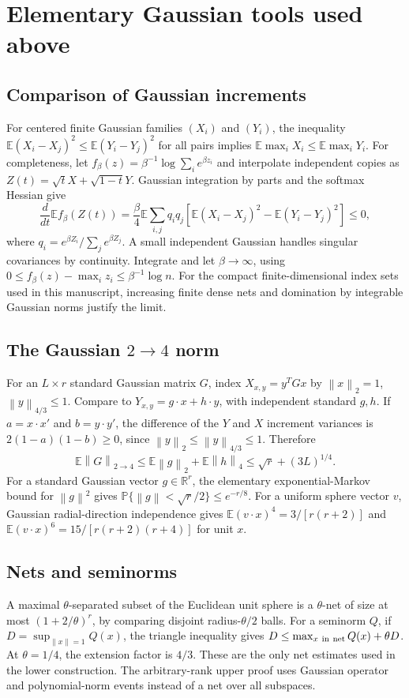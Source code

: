 \documentclass[11pt]{article}
\theoremstyle{remark}\newtheorem{remark}[theorem]{Remark}
\newcommand{\R}{\mathbb R}\newcommand{\E}{\mathbb E}\newcommand{\Prob}{\mathbb P}
\newcommand{\norm}[1]{\left\lVert#1\right\rVert}\newcommand{\abs}[1]{\left|#1\right|}
\numberwithin{equation}{section}
\begin{document}
\appendix
\section{Elementary Gaussian tools used above}\label{app:gaussian}
\subsection{Comparison of Gaussian increments}
For centered finite Gaussian families $(X_i)$ and $(Y_i)$, the inequality
$\E(X_i-X_j)^2\le\E(Y_i-Y_j)^2$ for all pairs implies
$\E\max_i X_i\le\E\max_i Y_i$.
For completeness, let $f_\beta(z)=\beta^{-1}\log\sum_i e^{\beta z_i}$ and interpolate independent copies as $Z(t)=\sqrt t X+\sqrt{1-t}Y$. Gaussian integration by parts and the softmax Hessian give
\[
 \frac d{dt}\E f_\beta(Z(t))
 =\frac\beta4\E\sum_{i,j}q_iq_j
 \left[\E(X_i-X_j)^2-\E(Y_i-Y_j)^2\right]\le0,
\]
where $q_i=e^{\beta Z_i}/\sum_j e^{\beta Z_j}$. A small independent Gaussian handles singular covariances by continuity. Integrate and let $\beta\to\infty$, using
$0\le f_\beta(z)-\max_i z_i\le\beta^{-1}\log n$.
For the compact finite-dimensional index sets used in this manuscript, increasing finite dense nets and domination by integrable Gaussian norms justify the limit.

\subsection{\texorpdfstring{The Gaussian $2\to4$ norm}{The Gaussian 2-to-4 norm}}
For an $L\times r$ standard Gaussian matrix $G$, index $X_{x,y}=y^TGx$ by $\norm x_2=1$, $\norm y_{4/3}\le1$. Compare to $Y_{x,y}=g\cdot x+h\cdot y$, with independent standard $g,h$. If $a=x\cdot x'$ and $b=y\cdot y'$, the difference of the $Y$ and $X$ increment variances is $2(1-a)(1-b)\ge0$, since $\norm y_2\le\norm y_{4/3}\le1$. Therefore
\[
 \E\norm G_{2\to4}\le\E\norm g_2+\E\norm h_4
 \le\sqrt r+(3L)^{1/4}.
\]
For a standard Gaussian vector $g\in\R^r$, the elementary exponential-Markov bound for $\norm g^2$ gives
$\Prob\{\norm g<\sqrt r/2\}\le e^{-r/8}$. For a uniform sphere vector $v$, Gaussian radial-direction independence gives
$\E(v\cdot x)^4=3/[r(r+2)]$ and
$\E(v\cdot x)^6=15/[r(r+2)(r+4)]$ for unit $x$.

\subsection{Nets and seminorms}
A maximal $\theta$-separated subset of the Euclidean unit sphere is a $\theta$-net of size at most $(1+2/\theta)^r$, by comparing disjoint radius-$\theta/2$ balls. For a seminorm $Q$, if $D=\sup_{\norm x=1}Q(x)$, the triangle inequality gives
$D\le\max_{x\ {\rm in\ net}}Q(x)+\theta D$.
At $\theta=1/4$, the extension factor is $4/3$. These are the only net estimates used in the lower construction. The arbitrary-rank upper proof uses Gaussian operator and polynomial-norm events instead of a net over all subspaces.
\end{document}
